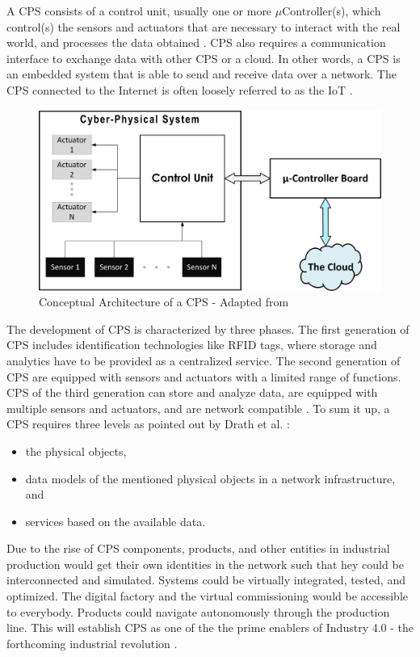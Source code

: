 {A \acs{CPS} consists of a control unit, usually one or more $\mu$Controller(s), which control(s) the sensors and actuators that are necessary to interact with the real world, and processes the data obtained . \acs{CPS} also requires a communication interface to exchange data with other \acs{CPS} or a cloud. In other words, a \acs{CPS} is an embedded system that is able to send and receive data over a network. The \acs{CPS} connected to the Internet is often loosely referred to as the \acs{IoT} \cite{CYBERIN}. 
\begin{figure}[h!]
	\includegraphics[scale=0.5]{./gfx/cpsdiag}
	\centering
	\caption{Conceptual Architecture of a \acs{CPS} - Adapted from \cite{CYBERIN}}
	\label{fig:2.9}
\end{figure}

The development of \acs{CPS} is characterized by three phases. The first generation of \acs{CPS} includes identification technologies like \acs{RFID} tags, where storage and analytics have to be provided as a centralized service. The second generation of \acs{CPS} are equipped with sensors and actuators with a limited range of functions. \acs{CPS} of the third generation can store and analyze data, are equipped with multiple sensors and actuators, and are network compatible \cite{IN4DESIGN}. To sum it up, a \acs{CPS} requires three levels as pointed out by Drath et al. \cite{IN4HYPE}:
\begin{itemize}
	\item the physical objects,
	\item data models of the mentioned physical objects in a network infrastructure, and
	\item services based on the available data.
\end{itemize}
Due to the rise of \acs{CPS} components, products, and other entities in industrial production would get their own identities in the network such that hey could be interconnected and simulated. Systems could be virtually integrated, tested, and optimized. The digital factory and the virtual commissioning would be accessible
to everybody. Products could navigate autonomously through the production line. This will establish \acs{CPS} as one of the the prime enablers of Industry 4.0 - the forthcoming industrial revolution \cite{IN4HYPE,IN4BCG}.
}
